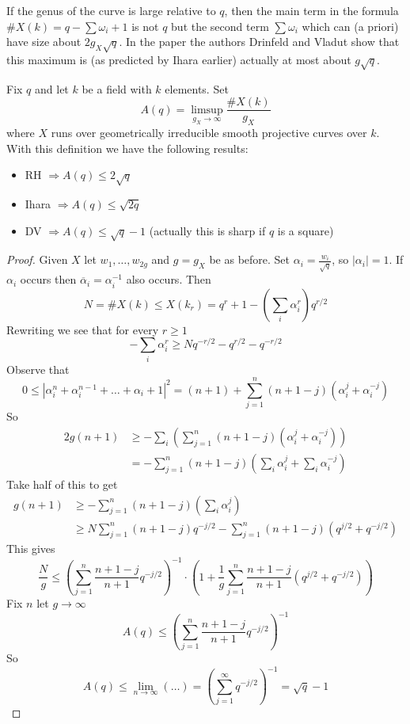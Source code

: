\noindent
If the genus of the curve is large relative to $q$, then the main
term in the formula $\# X(k) = q - \sum \omega_i + 1$ is not $q$
but the second term $\sum \omega_i$ which can (a priori) have
size about $2g_X\sqrt{q}$. In the paper \cite{Drinfeld-number}
the authors Drinfeld and Vladut show that this maximum is (as predicted
by Ihara earlier) actually at most about $g\sqrt{q}$.

\medskip\noindent
Fix $q$ and let $k$ be a field with $k$ elements. Set
$$
A(q) = \limsup_{g_X \to \infty} \frac{\# X(k)}{g_X}
$$
where $X$ runs over geometrically irreducible smooth projective
curves over $k$. With this definition we have the following results:
\begin{itemize}
\item RH $\Rightarrow A(q)\leq 2\sqrt{q}$
\item Ihara $\Rightarrow A(q)\leq \sqrt{2q}$
\item DV $\Rightarrow A(q)\leq \sqrt{q}-1$ (actually this is sharp if $q$
is a square)
\end{itemize}

\begin{proof}
Given $X$ let $w_1, \ldots, w_{2g}$ and $g = g_X$ be as before. Set
$\alpha_i = \frac{w_i}{\sqrt{q}}$, so $|\alpha_i| = 1$. If $\alpha_i$
occurs then $\overline{\alpha}_i = \alpha_i^{-1}$ also occurs. Then
$$
N = \# X(k) \leq X(k_r) = q^r + 1 - (\sum_i \alpha_i^r) q^{r/2}
$$
Rewriting we see that for every $r \geq 1$
$$
-\sum_i \alpha_i^r \geq Nq^{-r/2} - q^{r/2} - q^{-r/2}
$$
Observe that
$$
0 \leq |\alpha_i^n +\alpha_i^{n-1} +\ldots +\alpha_i +1|^2
= (n + 1) + \sum_{j = 1}^n (n + 1 - j) (\alpha_i^j + \alpha_i^{-j})
$$
So
\begin{align*}
2g(n+1) & \geq - \sum_i \left(\sum_{j = 1}^n (n+1-j)(\alpha_i^j
+\alpha_i^{-j})\right)\\
& =-\sum_{j = 1}^n (n+1-j)\left(\sum_i\alpha_i^j
+\sum_i\alpha_i^{-j}\right)
\end{align*}
Take half of this to get
\begin{align*}
g(n+1)& \geq - \sum_{j = 1}^n (n+1-j)(\sum_i\alpha_i^j)\\
& \geq N\sum_{j = 1}^n (n+1-j)q^{-j/2}-\sum_{j = 1}^n
(n+1-j)(q^{j/2}+q^{-j/2})
\end{align*}
This gives
$$
\frac{N}{g}\leq \left(\sum_{j = 1}^n \frac{n+1-j}{n+1}q^{-j/2} \right)^{-1}
\cdot
\left(
1 + \frac{1}{g} \sum_{j = 1}^n \frac{n + 1 - j}{n + 1}(q^{j/2} + q^{-j/2})
\right)
$$
Fix $n$ let $g\to \infty$
$$
A(q)\leq \left(\sum_{j = 1}^n \frac{n+1-j}{n+1}q^{-j/2}\right)^{-1}
$$
So
$$
A(q)\leq \lim_{n\to\infty}(\ldots) = \left(\sum_{j = 1}^\infty
q^{-j/2}\right)^{-1}=\sqrt{q}-1
$$
\end{proof}











